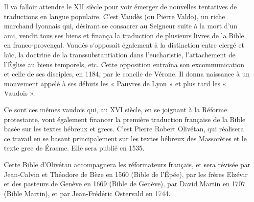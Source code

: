 \begin{small}
Il va falloir attendre le XII siècle pour voir émerger de nouvelles tentatives de traductions en langue populaire. C'est Vaudès (ou Pierre Valdo), un riche marchand lyonnais qui, désirant se consacrer au Seigneur suite à la mort d'un ami, vendit tous ses biens et finança la traduction de plusieurs livres de la Bible en franco-provençal. Vaudès s'opposait également à la distinction entre clergé et laïc, la doctrine de la transsubstantiation dans l'eucharistie, l'attachement de l'Église au biens temporels, etc. Cette opposition entraîna son excommunication et celle de ses disciples, en 1184, par le concile de Vérone. Il donna naissance à un mouvement appelé à ses débuts les « Pauvres de Lyon » et plus tard les « Vaudois ».\bigskip

Ce sont ces mêmes vaudois qui, au XVI siècle, en se joignant à la Réforme protestante, vont également financer la première traduction française de la Bible basée sur les textes hébreux et grecs. C'est Pierre Robert Olivétan, qui réalisera ce travail en se basant principalement sur les textes hébreux des Massorètes et le texte grec de Érasme. Elle sera publié en 1535.\bigskip

Cette Bible d'Olivétan accompagnera les réformateurs français, et sera révisée par Jean-Calvin et Théodore de Bèze en 1560 (Bible de l'Épée), par les frères Elzévir et des pasteurs de Genève en 1669 (Bible de Genève), par David Martin en 1707 (Bible Martin), et par Jean-Frédéric Ostervald en 1744.
\end{small}
